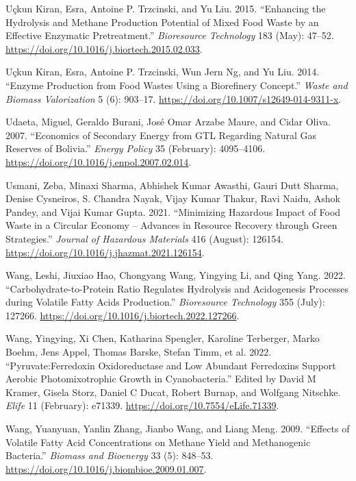 \documentclass[11pt]{report}
\begin{document}
\begin{hangparas}{1.5em}{1}
\hypertarget{citeproc_bib_item_69}{Uçkun Kiran, Esra, Antoine P. Trzcinski, and Yu Liu. 2015. “Enhancing the Hydrolysis and Methane Production Potential of Mixed Food Waste by an Effective Enzymatic Pretreatment.” \textit{Bioresource Technology} 183 (May): 47–52. \url{https://doi.org/10.1016/j.biortech.2015.02.033}.}

\hypertarget{citeproc_bib_item_70}{Uçkun Kiran, Esra, Antoine P. Trzcinski, Wun Jern Ng, and Yu Liu. 2014. “Enzyme Production from Food Wastes Using a Biorefinery Concept.” \textit{Waste and Biomass Valorization} 5 (6): 903–17. \url{https://doi.org/10.1007/s12649-014-9311-x}.}

\hypertarget{citeproc_bib_item_71}{Udaeta, Miguel, Geraldo Burani, José Omar Arzabe Maure, and Cidar Oliva. 2007. “Economics of Secondary Energy from GTL Regarding Natural Gas Reserves of Bolivia.” \textit{Energy Policy} 35 (February): 4095–4106. \url{https://doi.org/10.1016/j.enpol.2007.02.014}.}

\hypertarget{citeproc_bib_item_72}{Usmani, Zeba, Minaxi Sharma, Abhishek Kumar Awasthi, Gauri Dutt Sharma, Denise Cysneiros, S. Chandra Nayak, Vijay Kumar Thakur, Ravi Naidu, Ashok Pandey, and Vijai Kumar Gupta. 2021. “Minimizing Hazardous Impact of Food Waste in a Circular Economy – Advances in Resource Recovery through Green Strategies.” \textit{Journal of Hazardous Materials} 416 (August): 126154. \url{https://doi.org/10.1016/j.jhazmat.2021.126154}.}

\hypertarget{citeproc_bib_item_73}{Wang, Leshi, Jiuxiao Hao, Chongyang Wang, Yingying Li, and Qing Yang. 2022. “Carbohydrate-to-Protein Ratio Regulates Hydrolysis and Acidogenesis Processes during Volatile Fatty Acids Production.” \textit{Bioresource Technology} 355 (July): 127266. \url{https://doi.org/10.1016/j.biortech.2022.127266}.}

\hypertarget{citeproc_bib_item_74}{Wang, Yingying, Xi Chen, Katharina Spengler, Karoline Terberger, Marko Boehm, Jens Appel, Thomas Barske, Stefan Timm, et al. 2022. “Pyruvate:Ferredoxin Oxidoreductase and Low Abundant Ferredoxins Support Aerobic Photomixotrophic Growth in Cyanobacteria.” Edited by David M Kramer, Gisela Storz, Daniel C Ducat, Robert Burnap, and Wolfgang Nitschke. \textit{Elife} 11 (February): e71339. \url{https://doi.org/10.7554/eLife.71339}.}

\hypertarget{citeproc_bib_item_75}{Wang, Yuanyuan, Yanlin Zhang, Jianbo Wang, and Liang Meng. 2009. “Effects of Volatile Fatty Acid Concentrations on Methane Yield and Methanogenic Bacteria.” \textit{Biomass and Bioenergy} 33 (5): 848–53. \url{https://doi.org/10.1016/j.biombioe.2009.01.007}.}


\end{hangparas}
\end{document}
